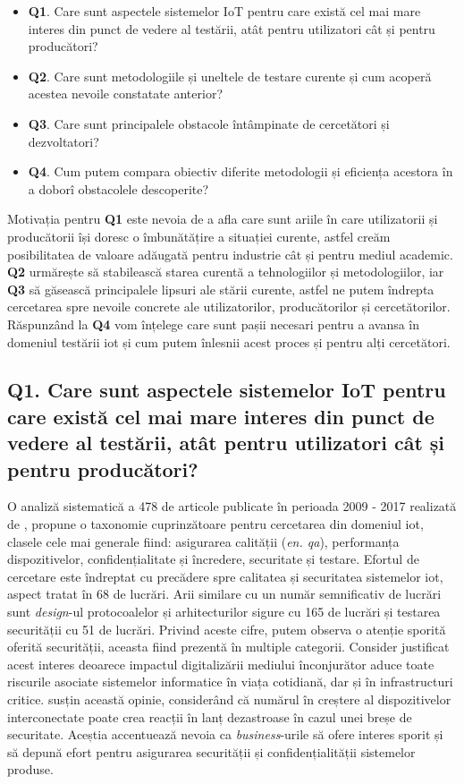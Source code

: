 \begin{itemize}
    \item[] \textbf{Q1}. Care sunt aspectele sistemelor IoT pentru care există cel mai mare interes din punct de vedere al testării, atât pentru utilizatori cât și pentru producători?
    \item[] \textbf{Q2}. Care sunt metodologiile și uneltele de testare curente și cum acoperă acestea nevoile constatate anterior?
    \item[] \textbf{Q3}. Care sunt principalele obstacole întâmpinate de cercetători și dezvoltatori?
    \item[] \textbf{Q4}. Cum putem compara obiectiv diferite metodologii și eficiența acestora în a doborî obstacolele descoperite?
\end{itemize}

Motivația pentru \textbf{Q1} este nevoia de a afla care sunt ariile în care utilizatorii și producătorii își doresc o îmbunătățire a situației curente, astfel creăm posibilitatea de valoare adăugată pentru industrie cât și pentru mediul academic. \textbf{Q2} urmărește să stabilească starea curentă a tehnologiilor și metodologiilor, iar \textbf{Q3} să găsească principalele lipsuri ale stării curente, astfel ne putem îndrepta cercetarea spre nevoile concrete ale utilizatorilor, producătorilor și cercetătorilor. Răspunzând la \textbf{Q4} vom înțelege care sunt pașii necesari pentru a avansa în domeniul testării \acrshort{iot} și cum putem înlesnii acest proces și pentru alți cercetători. 

\subsection*{Q1. Care sunt aspectele sistemelor IoT pentru care există cel mai mare interes din punct de vedere al testării, atât pentru utilizatori cât și pentru producători?}

O analiză sistematică a 478 de articole publicate în perioada 2009 - 2017 realizată de \cite{Ahmed2019}, propune o taxonomie cuprinzătoare pentru cercetarea din domeniul \acrshort{iot}, clasele cele mai generale fiind: asigurarea calității (\textit{en. \acrlong{qa}}), performanța dispozitivelor, confidențialitate și încredere, securitate și testare. Efortul de cercetare este îndreptat cu precădere spre calitatea și securitatea sistemelor \acrshort{iot}, aspect tratat în 68 de lucrări. Arii similare cu un număr semnificativ de lucrări sunt \textit{design}-ul protocoalelor și arhitecturilor sigure cu 165 de lucrări și testarea securității cu 51 de lucrări. Privind aceste cifre, putem observa o atenție sporită oferită securității, aceasta fiind prezentă în multiple categorii. Consider justificat acest interes deoarece impactul digitalizării mediului înconjurător aduce toate riscurile asociate sistemelor informatice în viața cotidiană, dar și în infrastructuri critice. \cite{Lee2015} susțin această opinie, considerând că numărul în creștere al dispozitivelor interconectate poate crea reacții în lanț dezastroase în cazul unei breșe de securitate. Aceștia accentuează nevoia ca \textit{business}-urile să ofere interes sporit și să depună efort pentru asigurarea securității și confidențialității sistemelor produse.

